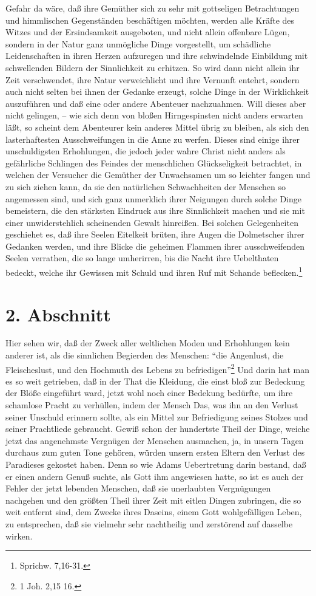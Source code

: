 Gefahr da wäre, daß ihre Gemüther sich zu sehr mit gottseligen Betrachtungen und himmlischen Gegenständen beschäftigen möchten, werden alle Kräfte des Witzes und der Ersindsamkeit ausgeboten, und nicht allein offenbare Lügen, sondern in der Natur ganz unmögliche Dinge vorgestellt, um schädliche Leidenschaften in ihren Herzen aufzuregen und ihre schwindelnde Einbildung mit schwellenden Bildern der Sinnlichkeit zu erhitzen. So wird dann nicht allein ihr Zeit verschwendet, ihre Natur verweichlicht und ihre Vernunft entehrt, sondern auch nicht selten bei ihnen der Gedanke erzeugt, solche Dinge in der Wirklichkeit auszuführen und daß eine oder andere Abenteuer nachzuahmen. Will dieses aber nicht gelingen, -- wie sich denn von bloßen Hirngespinsten nicht anders erwarten läßt, so scheint dem Abenteurer kein anderes Mittel übrig zu bleiben, als sich den lasterhaftesten Ausschweifungen in die Anne zu werfen. Dieses sind einige ihrer unschuldigsten Erhohlungen, die jedoch jeder wahre Christ nicht anders als gefährliche Schlingen des Feindes der menschlichen Glückseligkeit betrachtet, in welchen der Versucher die Gemüther der Unwachsamen um so leichter fangen und zu sich ziehen kann, da sie den natürlichen Schwachheiten der Menschen so angemessen sind, und sich ganz unmerklich ihrer Neigungen durch solche Dinge bemeistern, die den stärksten Eindruck aus ihre Sinnlichkeit machen und sie mit einer unwiderstehlich scheinenden Gewalt hinreißen. Bei solchen Gelegenheiten geschiehet es, daß ihre Seelen Eitelkeit brüten, ihre Augen die Dolmetscher ihrer Gedanken werden, und ihre Blicke die geheimen Flammen ihrer ausschweifenden Seelen verrathen, die so lange umherirren, bis die Nacht ihre Uebelthaten bedeckt, welche ihr Gewissen mit Schuld und ihren Ruf mit Schande beflecken.\footnote{Sprichw. 7,16-31.}

\section{2. Abschnitt}

Hier sehen wir, daß der Zweck aller weltlichen Moden und Erhohlungen kein anderer ist, als die sinnlichen Begierden des Menschen: "`die Angenlust, die Fleischeslust, und den Hochmuth des Lebens zu befriedigen"'\footnote{1 Joh. 2,15 16.} Und darin hat man es so weit getrieben, daß in der That die Kleidung, die einst bloß zur Bedeckung der Blöße eingeführt ward, jetzt wohl noch einer Bedekung bedürfte, um ihre schamlose Pracht zu verhüllen, indem der Mensch Das, was ihn an den Verlust seiner Unschuld erinnern sollte, als ein Mittel zur Befriedigung seines Stolzes und seiner Prachtliede gebraucht. Gewiß schon der hundertste Theil der Dinge, weiche jetzt das angenehmste Vergnügen der Menschen ausmachen, ja, in unsern Tagen durchaus zum guten Tone gehören, würden unsern ersten Eltern den Verlust des Paradieses gekostet haben. Denn so wie Adams Uebertretung darin bestand, daß er einen andern Genuß suchte, als Gott ihm angewiesen hatte, so ist es auch der Fehler der jetzt lebenden Menschen, daß sie unerlaubten Vergnügungen nachgehen und den größten Theil ihrer Zeit mit eitlen Dingen zubringen, die so weit entfernt sind, dem Zwecke ihres Daseins, einem Gott wohlgefälligen Leben, zu entsprechen, daß sie vielmehr sehr nachtheilig und zerstörend auf dasselbe wirken.

